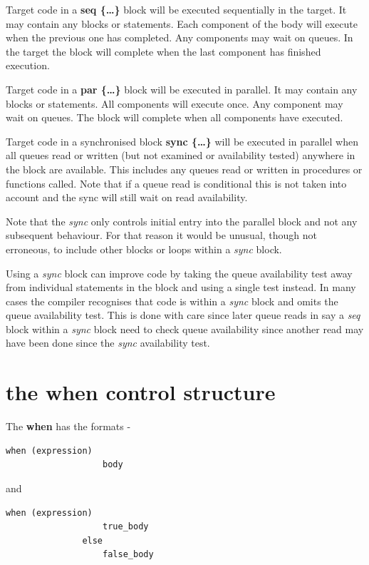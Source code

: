         Target code in a {\bf seq \{\dots\}} block will be executed
        sequentially in the target. It may contain any blocks or statements.
        Each component of the body will execute when the previous one has
        completed. Any components may wait on queues. In the target the block
        will complete when the last component has finished execution.

        Target code in a {\bf par \{\dots\}} block will be executed in
        parallel. It may contain any blocks or statements. All components
        will execute once. Any component may wait on queues. The block will
        complete when all components have executed.

        Target code in a synchronised block {\bf sync \{\dots\}} will be
        executed in parallel when all queues read or written (but not examined
        or availability tested) anywhere in the block are available. This
        includes any queues read or written in procedures or functions called.
        Note that if a queue read is conditional this is not taken into account
        and the sync will still wait on read availability.
        
        Note that the {\em sync} only controls initial entry into the parallel
        block and not any subsequent behaviour. For that reason it would be
        unusual, though not erroneous, to include other blocks or loops within a
        {\em sync} block.

        Using a {\em sync} block can improve code by taking the queue
        availability test away from individual statements in the block and
        using a single test instead. In many cases the compiler recognises
        that code is within a {\em sync} block and omits the queue
        availability test. This is done with care since later queue reads in
        say a {\em seq} block within a {\em sync} block need to check queue
        availability since another read may have been done since the {\em
        sync} availability test.








    \section{the {\bf when} control structure}\label{sec:when_struct}
    
        The {\bf when} has the formats -
        \begin{lstlisting}[gobble=8, language=threepl]
               when (expression)
                   body
        \end{lstlisting}
        and
        \begin{lstlisting}[gobble=8, language=threepl]
               when (expression)
                   true_body
               else
                   false_body
        \end{lstlisting}

